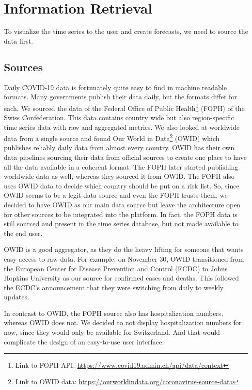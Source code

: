
\section{Information Retrieval}

To visualize the time series to the user and create forecasts, we need to source the data first.

\subsection{Sources}

Daily COVID-19 data is fortunately quite easy to find in machine readable formats. Many governments publish their data daily, but the formats differ for each. We sourced the data of the Federal Office of Public Health\footnote{Link to FOPH API: \href{https://www.covid19.admin.ch/api/data/context}{https://www.covid19.admin.ch/api/data/context}} (FOPH) of the Swiss Confederation. This data contains country wide but also region-specific time series data with raw and aggregated metrics. We also looked at worldwide data from a single source and found Our World in Data\footnote{Link to OWID data: \href{https://ourworldindata.org/coronavirus-source-data}{https://ourworldindata.org/coronavirus-source-data}} (OWID) which publishes reliably daily data from almost every country. OWID has their own data pipelines sourcing their data from official sources to create one place to have all the data available in a coherent format. The FOPH later started publishing worldwide data as well, whereas they sourced it from OWID. The FOPH also uses OWID data to decide which country should be put on a risk list. So, since OWID seems to be a legit data source and even the FOPH trusts them, we decided to have OWID as our main data source but leave the architecture open for other sources to be integrated into the platform. In fact, the FOPH data is still sourced and present in the time series database, but not made available to the end user.

OWID is a good aggregator, as they do the heavy lifting for someone that wants easy access to raw data. For example, on November 30, OWID transitioned from the European Center for Disease Prevention and Control (ECDC) to Johns Hopkins University as our source for confirmed cases and deaths. This followed the ECDC’s announcement that they were switching from daily to weekly updates.

In contrast to OWID, the FOPH source also has hospitalization numbers, whereas OWID does not. We decided to not display hospitalization numbers for now, since they would only be available for Switzerland. And that would complicate the design of an easy-to-use user interface.

